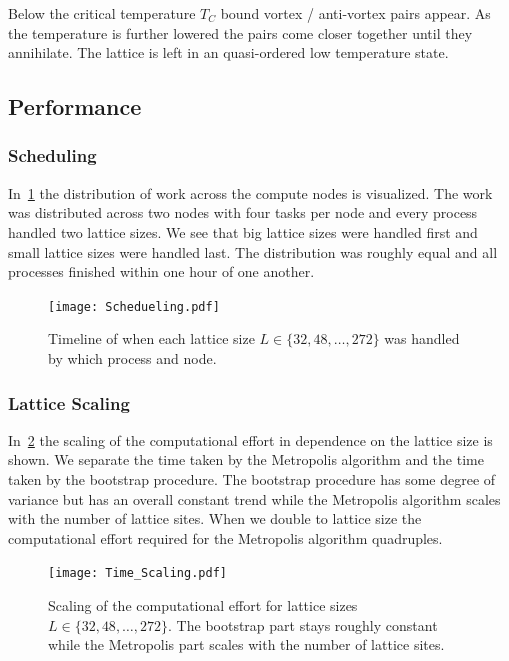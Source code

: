 Below the critical temperature $T_C$ bound vortex / anti-vortex pairs appear. As the temperature is further lowered the pairs come closer together until they annihilate. The lattice is left in an quasi-ordered low temperature state.

\subsection{Performance}\label{sec:performance}
\subsubsection{Scheduling}
In~\cref{fig:scheduling} the distribution of work across the compute nodes is visualized. The work was distributed across two nodes with four tasks per node and every process handled two lattice sizes. We see that big lattice sizes were handled first and small lattice sizes were handled last. The distribution was roughly equal and all processes finished within one hour of one another.
\begin{figure}
	\centering
	\texttt{[image: Schedueling.pdf]}
	\caption[Timeline of when each lattize size was handled by which process and node.]{Timeline of when each lattice size $L\in\{32, 48, \dots, 272\}$ was handled by which process and node.}
	\label{fig:scheduling}
\end{figure}

\subsubsection{Lattice Scaling}
In~\cref{fig:scaling} the scaling of the computational effort in dependence on the lattice size is shown. We separate the time taken by the Metropolis algorithm and the time taken by the bootstrap procedure. The bootstrap procedure has some degree of variance but has an overall constant trend while the Metropolis algorithm scales with the number of lattice sites. When we double to lattice size the computational effort required for the Metropolis algorithm quadruples.
\begin{figure}
	\centering
	\texttt{[image: Time\_Scaling.pdf]}
	\caption[Scaling of the computational effort based on lattice size]{Scaling of the computational effort for lattice sizes $L\in\{32, 48, \dots, 272\}$. The bootstrap part stays roughly constant while the Metropolis part scales with the number of lattice sites.}
	\label{fig:scaling}
\end{figure}

